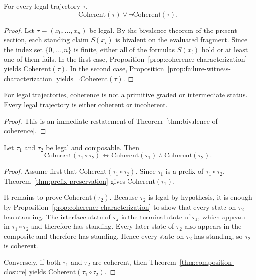\begin{theorem}
\label{thm:bivalence-of-coherence}
For every legal trajectory $\tau$,
\[
\mathrm{Coherent}(\tau) \vee \neg\mathrm{Coherent}(\tau).
\]
\end{theorem}

\begin{proof}
Let $\tau=(x_0,\dots,x_n)$ be legal. By the bivalence theorem of the present section, each standing claim $S(x_i)$ is bivalent on the evaluated fragment. Since the index set $\{0,\dots,n\}$ is finite, either all of the formulas $S(x_i)$ hold or at least one of them fails. In the first case, Proposition~\ref{prop:coherence-characterization} yields $\mathrm{Coherent}(\tau)$. In the second case, Proposition~\ref{prop:failure-witness-characterization} yields $\neg\mathrm{Coherent}(\tau)$.\cite{MaleyTrajectory}
\end{proof}

\begin{corollary}
\label{cor:no-partial-coherence}
For legal trajectories, coherence is not a primitive graded or intermediate status. Every legal trajectory is either coherent or incoherent.
\end{corollary}

\begin{proof}
This is an immediate restatement of Theorem~\ref{thm:bivalence-of-coherence}.
\end{proof}

\begin{theorem}
\label{thm:exact-factorization-under-composition}
Let $\tau_1$ and $\tau_2$ be legal and composable. Then
\[
\mathrm{Coherent}(\tau_1\circ \tau_2) \iff \mathrm{Coherent}(\tau_1) \wedge \mathrm{Coherent}(\tau_2).
\]
\end{theorem}

\begin{proof}
Assume first that $\mathrm{Coherent}(\tau_1\circ \tau_2)$. Since $\tau_1$ is a prefix of $\tau_1\circ \tau_2$, Theorem~\ref{thm:prefix-preservation} gives $\mathrm{Coherent}(\tau_1)$.

It remains to prove $\mathrm{Coherent}(\tau_2)$. Because $\tau_2$ is legal by hypothesis, it is enough by Proposition~\ref{prop:coherence-characterization} to show that every state on $\tau_2$ has standing. The interface state of $\tau_2$ is the terminal state of $\tau_1$, which appears in $\tau_1\circ \tau_2$ and therefore has standing. Every later state of $\tau_2$ also appears in the composite and therefore has standing. Hence every state on $\tau_2$ has standing, so $\tau_2$ is coherent.

Conversely, if both $\tau_1$ and $\tau_2$ are coherent, then Theorem~\ref{thm:composition-closure} yields $\mathrm{Coherent}(\tau_1\circ \tau_2)$.\cite{MaleyTrajectory}
\end{proof}

